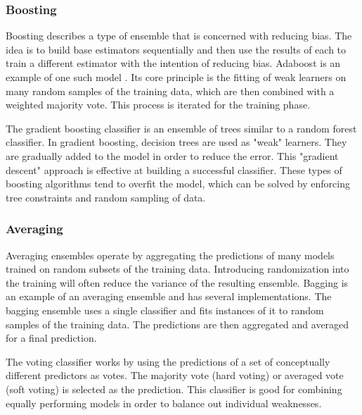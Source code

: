 \subsubsection{Boosting}
Boosting describes a type of ensemble that is concerned with reducing bias.
The idea is to build base estimators sequentially and then use the results of each to train a different estimator with the intention of reducing bias.
Adaboost is an example of one such model \cite{freund1995desicion}.
Its core principle is the fitting of weak learners on many random samples of the training data, which are then combined with a weighted majority vote. 
This process is iterated for the training phase.



\par
The gradient boosting classifier is an ensemble of trees similar to a random forest classifier.
In gradient boosting, decision trees are used as "weak" learners.
They are gradually added to the model in order to reduce the error.
This "gradient descent" approach is effective at building a successful classifier.
These types of boosting algorithms tend to overfit the model, which can be solved by enforcing tree constraints and random sampling of data.


\subsubsection{Averaging}
Averaging ensembles operate by aggregating the predictions of many models trained on random subsets of the training data.
Introducing randomization into the training will often reduce the variance of the resulting ensemble.
Bagging is an example of an averaging ensemble and has several implementations.
The bagging ensemble uses a single classifier and fits instances of it to random samples of the training data.
The predictions are then aggregated and averaged for a final prediction.

The voting classifier works by using the predictions of a set of conceptually different predictors as votes.
The majority vote (hard voting) or averaged vote (soft voting) is selected as the prediction.
This classifier is good for combining equally performing models in order to balance out individual weaknesses.\\


